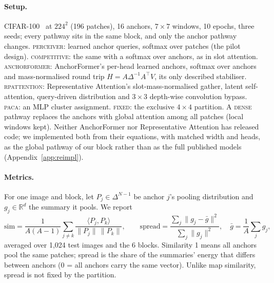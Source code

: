 \documentclass[runningheads]{llncs}
\begin{document}
\paragraph{Setup.} CIFAR-100~\cite{krizhevsky2009cifar} at $224^2$ (196 patches), 16 anchors,
$7\times7$ windows, 10 epochs, three seeds; every pathway sits in the same block, and only the
anchor pathway changes. \textsc{perceiver}: learned anchor queries, softmax over patches (the
pilot design). \textsc{competitive}: the same with a softmax over anchors, as in slot attention.
\textsc{anchorformer}: AnchorFormer's per-head learned anchors, softmax over anchors and
mass-normalised round trip $H=A\Delta^{-1}A^{\top}V$, its only described stabiliser.
\textsc{rpattention}: Representative Attention's slot-mass-normalised gather, latent
self-attention, query-driven distribution and $3\times3$ depth-wise convolution bypass.
\textsc{paca}: an MLP cluster assignment. \textsc{fixed}: the exclusive $4\times4$ partition. A
\textsc{dense} pathway replaces the anchors with global attention among all patches (local windows
kept). Neither AnchorFormer nor Representative Attention has released code; we implemented both
from their equations, with matched width and heads, as the global pathway of our block rather
than as the full published models (Appendix~\ref{app:reimpl}).

\paragraph{Metrics.} For one image and block, let $P_j\in\Delta^{N-1}$ be anchor $j$'s pooling
distribution and $g_j\in\mathbb{R}^{d}$ the summary it pools. We report
\begin{equation}
\mathrm{sim}=\frac{1}{A(A-1)}\sum_{j\neq k}\frac{\langle P_j,P_k\rangle}{\|P_j\|\,\|P_k\|},
\qquad
\mathrm{spread}=\frac{\sum_j\|g_j-\bar g\|^2}{\sum_j\|g_j\|^2},\quad \bar g=\frac{1}{A}\sum_j g_j ,
\label{eq:metrics}
\end{equation}
averaged over 1{,}024 test images and the 6 blocks. Similarity 1 means all anchors pool the same
patches; spread is the share of the summaries' energy that differs between anchors (0 = all
anchors carry the same vector). Unlike map similarity, spread is not fixed by the partition.
\end{document}
